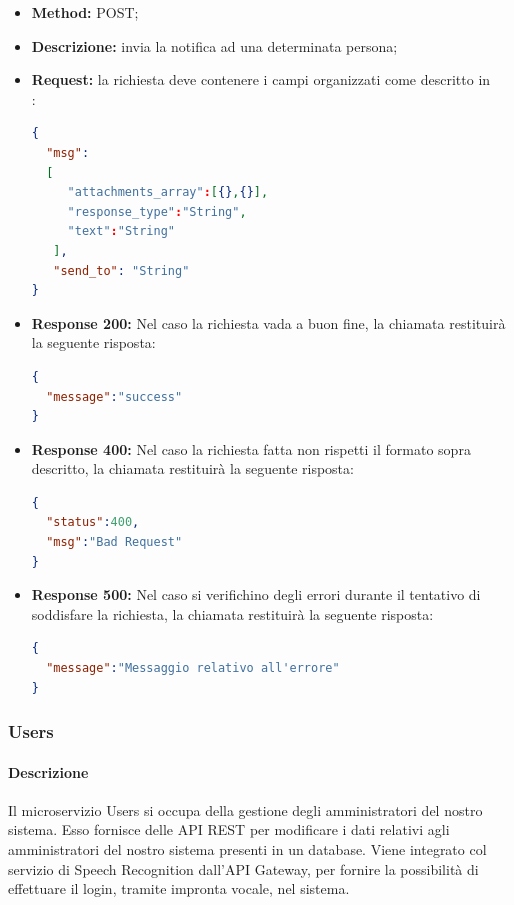 \begin{itemize}
\begin{itemize}
\item \textbf{Method:} POST;
\item \textbf{Descrizione:} invia la notifica ad una determinata persona;
\item \textbf{Request:} la richiesta deve contenere i campi organizzati come descritto in \\:
\begin{lstlisting}[language=json,firstnumber=1]
{
  "msg":
  [
     "attachments_array":[{},{}],
	 "response_type":"String",
	 "text":"String"
   ],
   "send_to": "String"
}
\end{lstlisting}
\item \textbf{Response 200:} Nel caso la richiesta vada a buon fine, la chiamata restituirà la seguente risposta:
\begin{lstlisting}[language=json,firstnumber=1]
{
  "message":"success"
}
\end{lstlisting}
\item \textbf{Response 400:} Nel caso la richiesta fatta non rispetti il formato sopra descritto, la chiamata restituirà la seguente risposta:
\begin{lstlisting}[language=json,firstnumber=1]
{
  "status":400,
  "msg":"Bad Request"
}
\end{lstlisting}
\item \textbf{Response 500:} Nel caso si verifichino degli errori durante il tentativo di soddisfare la richiesta, la chiamata restituirà la seguente risposta:
\begin{lstlisting}[language=json,firstnumber=1]
{
  "message":"Messaggio relativo all'errore"
}
\end{lstlisting}
\end{itemize}
\end{itemize}

\subsubsection{Users}
\paragraph{Descrizione}
Il microservizio Users si occupa della gestione degli amministratori del nostro sistema. Esso fornisce delle API REST per modificare i dati relativi agli amministratori del nostro sistema presenti in un database. Viene integrato col servizio di Speech Recognition dall'API Gateway, per fornire la possibilità di effettuare il login, tramite impronta vocale, nel sistema.
